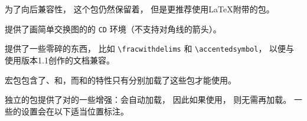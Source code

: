 为了向后兼容性，  这个包仍然保留着，  但是更推荐使用\LaTeX 附带的包。

提供了画简单交换图的的 \verb|CD| 环境（不支持对角线的箭头）。

提供了一些零碎的东西，  比如 \verb|\fracwithdelims| 和 \verb|\accentedsymbol|，  以便与使用版本1.1创作的文档兼容。

宏包包含了、和，而和的特性只有分别加载了这些包才能使用。


独立的包\cite{10}提供了对的一些增强：会自动加载，  因此如果使用，  则无需再加载。 一些的设置会在以下适当位置标注。